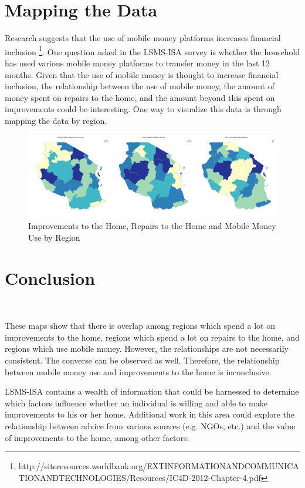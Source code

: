 \documentclass[11pt]{article}
\begin{document}
\section{Mapping the Data}\label{map}
  Research suggests that the use of mobile money platforms increases financial inclusion \footnote{http://siteresources.worldbank.org/EXTINFORMATIONANDCOMMUNICATIONANDTECHNOLOGIES/Resources/IC4D-2012-Chapter-4.pdf}. One question asked in the LSMS-ISA survey is whether the household has used various mobile money platforms to transfer money in the last 12 months. Given that the use of mobile money is thought to increase financial inclusion, the relationship between the use of mobile money, the amount of money spent on repairs to the home, and the amount beyond this spent on improvements could be interesting. One way to visualize this data is through mapping the data by region. 
  

\begin{figure}[h]
\centering
\includegraphics{PUBPOL599B_Final_Project_Exec-location}
\caption{Improvements to the Home, Repairs to the Home and Mobile Money Use by Region}
\end{figure}

\section{Conclusion}\

  These maps show that there is overlap among regions which spend a lot on improvements to the home, regions which spend a lot on repairs to the home, and regions which use mobile money. However, the relationships are not necessarily consistent. The converse can be observed as well. Therefore, the relationship between mobile money use and improvements to the home is inconclusive. 

  LSMS-ISA contains a wealth of information that could be harnessed to determine which factors influence whether an individual is willing and able to make improvements to his or her home. Additional work in this area could explore the relationship between advice from various sources (e.g. NGOs, etc.) and the value of improvements to the home, among other factors.  
  
\end{document}
